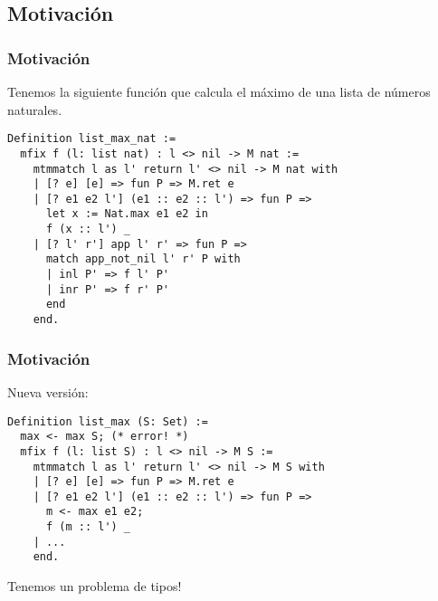 \documentclass{beamer}
\begin{document}
\begin{frame}[fragile]
\section{Motivación}
\frametitle{Motivación}

Tenemos la siguiente función que calcula el máximo de una lista de números naturales.
\begin{lstlisting}
Definition list_max_nat :=
  mfix f (l: list nat) : l <> nil -> M nat :=
    mtmmatch l as l' return l' <> nil -> M nat with
    | [? e] [e] => fun P => M.ret e
    | [? e1 e2 l'] (e1 :: e2 :: l') => fun P =>
      let x := Nat.max e1 e2 in
      f (x :: l') _
    | [? l' r'] app l' r' => fun P =>
      match app_not_nil l' r' P with
      | inl P' => f l' P'
      | inr P' => f r' P'
      end
    end.
\end{lstlisting}

\end{frame}


\begin{frame}[fragile]
\frametitle{Motivación}

Nueva versión:
\begin{lstlisting}
Definition list_max (S: Set) :=
  max <- max S; (* error! *)
  mfix f (l: list S) : l <> nil -> M S :=
    mtmmatch l as l' return l' <> nil -> M S with
    | [? e] [e] => fun P => M.ret e
    | [? e1 e2 l'] (e1 :: e2 :: l') => fun P =>
      m <- max e1 e2;
      f (m :: l') _
    | ...
    end.
\end{lstlisting}

Tenemos un problema de tipos!
\end{frame}
\end{document}
